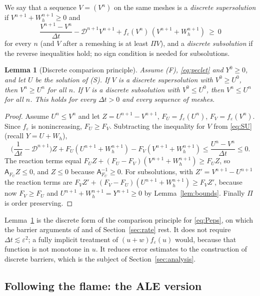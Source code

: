 \documentclass[11pt]{amsart}
\newtheorem{lemma}[theorem]{Lemma}
\theoremstyle{definition}
\theoremstyle{remark}
\newcommand{\ve}{\varepsilon}
\begin{document}
We say that a sequence $V=(V^n)$ on the same meshes is a \emph{discrete
supersolution} if $V^{n+1}+W_h^{n+1}\ge0$ and
\[
\frac{V^{n+1}-V^n}{\Delta t}-\mathcal D^{n+1}V^{n+1}+f_\ve(V^n)\,(V^{n+1}+W_h^{n+1})\ \ge\ 0
\]
for every $n$ (and $V$ after a remeshing is at least $\Pi V$), and a \emph{discrete
subsolution} if the reverse inequalities hold; no sign condition is needed for
subsolutions.

\begin{lemma}[Discrete comparison principle]\label{lem:comparison}
Assume (F), \eqref{eq:peclet} and $Y^0\ge0$, and let $U$ be the solution of (S). If $V$ is
a discrete supersolution with $V^0\ge U^0$, then $V^n\ge U^n$ for all $n$. If $V$ is a
discrete subsolution with $V^0\le U^0$, then $V^n\le U^n$ for all $n$. This holds for
every $\Delta t>0$ and every sequence of meshes.
\end{lemma}

\begin{proof}
Assume $U^n\le V^n$ and let $Z=U^{n+1}-V^{n+1}$, $F_U=f_\ve(U^n)$, $F_V=f_\ve(V^n)$.
Since $f_\ve$ is nonincreasing, $F_U\ge F_V$. Subtracting the inequality for $V$ from
\eqref{eq:SU} (recall $Y=U+W_h$),
\[
\Big(\frac1{\Delta t}-\mathcal D^{n+1}\Big)Z+F_U(U^{n+1}+W_h^{n+1})-F_V(V^{n+1}+W_h^{n+1})
\le\frac{U^n-V^n}{\Delta t}\le0 .
\]
The reaction terms equal $F_UZ+(F_U-F_V)(V^{n+1}+W_h^{n+1})\ge F_UZ$, so
$\mathsf A_{F_U}Z\le0$, and $Z\le0$ because $\mathsf A_{F_U}^{-1}\ge0$. For subsolutions, with
$Z'=V^{n+1}-U^{n+1}$ the reaction terms are
$F_VZ'+(F_V-F_U)(U^{n+1}+W_h^{n+1})\ge F_VZ'$, because now $F_V\ge F_U$ and
$U^{n+1}+W_h^{n+1}=Y^{n+1}\ge0$ by Lemma~\ref{lem:bounds}. Finally $\Pi$ is order preserving.
\end{proof}

Lemma~\ref{lem:comparison} is the discrete form of the comparison principle for
\eqref{eq:Peps}, on which the barrier arguments of
\cite{LedermanVazquezWolanski2001,Petrosyan2002,FernandezBonderWolanski2004} and of
Section~\ref{sec:rate} rest. It does not require $\Delta t\lesssim\ve^2$; a fully
implicit treatment of $(u+w)f_\ve(u)$ would, because that function is not
monotone in $u$. It reduces error estimates to the construction of discrete
barriers, which is the subject of Section~\ref{sec:analysis}.

\subsection{Following the flame: the ALE version}\label{sec:ale}
\end{document}
